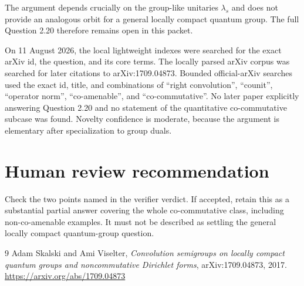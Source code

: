 \documentclass[11pt]{article}
\begin{document}
The argument depends crucially on the group-like unitaries $\lambda_s$ and
does not provide an analogous orbit for a general locally compact quantum
group. The full Question 2.20 therefore remains open in this packet.

On 11 August 2026, the local lightweight indexes were searched for the exact
arXiv id, the question, and its core terms. The locally parsed arXiv corpus was
searched for later citations to arXiv:1709.04873. Bounded official-arXiv
searches used the exact id, title, and combinations of ``right convolution'',
``counit'', ``operator norm'', ``co-amenable'', and ``co-commutative''. No
later paper explicitly answering Question 2.20 and no statement of the
quantitative co-commutative subcase was found. Novelty confidence is moderate,
because the argument is elementary after specialization to group duals.

\section{Human review recommendation}

Check the two points named in the verifier verdict. If accepted, retain this
as a substantial partial answer covering the whole co-commutative class,
including non-co-amenable examples. It must not be described as settling the
general locally compact quantum-group question.

\begin{thebibliography}{9}
Adam Skalski and Ami Viselter,
\emph{Convolution semigroups on locally compact quantum groups and
noncommutative Dirichlet forms},
arXiv:1709.04873, 2017.
\url{https://arxiv.org/abs/1709.04873}
\end{thebibliography}
\end{document}
